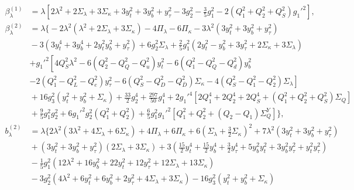 \documentclass[preprint,amsmath,amssymb,aps,superscriptaddress,prd,showpacs,floatfix,nofootinbib]{revtex4-1}
\begin{document}
\begin{subequations}\label{eq:USSMLambdaBetas}
\begin{align}
\beta_\lambda^{(1)}&=\lambda  \left[2\lambda ^2+2 \Sigma_\lambda +3 \Sigma_\kappa +3 y_t^2+3 y_b^2+y_{\tau }^2-3 g_2^2-\frac{3}{5} g_1^2 -2 \left ( Q_1^2 + Q_2^2 + Q_S^2\right )g_1'^2 \right],\label{eq:USSMLambdaBetaOneLoop}\\
\beta_\lambda^{(2)}&=\lambda \bigg \{ -2\lambda^2\left ( \lambda^2+2\Sigma_\lambda+3\Sigma_\kappa\right )-4\Pi_\lambda-6\Pi_\kappa-3\lambda^2\left ( 3y_t^2+3y_b^2+y_\tau^2\right ) \nonumber\\
&{} -3\left ( 3y_t^4+3y_b^4+2y_t^2y_b^2+y_\tau^2 \right )+6g_2^2\Sigma_\lambda+\frac{2}{5}g_1^2\left ( 2y_t^2-y_b^2+3y_\tau^2+2\Sigma_\kappa +3\Sigma_\lambda\right )\nonumber\\
&{}\left.+g_1'^2\left [ 4Q_S^2\lambda^2 -6\left ( Q_2^2-Q_Q^2-Q_u^2\right )y_t^2-6\left ( Q_1^2-Q_Q^2-Q_d^2\right )y_b^2 \right.\right.\nonumber\\
&{}\left.-2\left ( Q_1^2-Q_L^2-Q_e^2\right )y_\tau^2-6\left ( Q_S^2-Q_D^2-Q_{\overline{D}}^2 \right )\Sigma_\kappa-4\left ( Q_S^2-Q_1^2-Q_2^2\right )\Sigma_\lambda\right ]\nonumber\\
&{}+16g_3^2\left ( y_t^2+y_b^2+\Sigma_\kappa\right ) +\frac{33}{2}g_2^4+\frac{297}{50}g_1^4+2g_1'^4\left [ 2Q_1^4+2Q_2^4+2Q_S^4+\left ( Q_1^2+Q_2^2+Q_S^2\right )\Sigma_{Q}\right ]\nonumber\\
&{}+\frac{9}{5}g_1^2g_2^2+6g_1'^2g_2^2\left ( Q_1^2+Q_2^2\right )+\frac{6}{5}g_1^2g_1'^2\left [Q_1^2+Q_2^2+\left ( Q_2-Q_1\right )\Sigma_{Q}^Y\right ]\bigg \},\label{eq:USSMLambdaBetaTwoLoop}\\
b_\lambda^{(2)}&=\lambda \bigg \{ 2\lambda^2\left ( 3\lambda^2 +4\Sigma_\lambda +6\Sigma_\kappa \right )+4\Pi_\lambda + 6\Pi_\kappa +6\left ( \Sigma_\lambda+\frac{3}{2}\Sigma_\kappa\right )^2+7\lambda^2\left ( 3y_t^2+3y_b^2+y_\tau^2\right )\nonumber\\
&{}+\left ( 3y_t^2+3y_b^2+y_\tau^2\right )\left (2\Sigma_\lambda+3\Sigma_\kappa\right ) +3\left ( \frac{15}{2}y_t^4+\frac{15}{2}y_b^4+\frac{3}{2}y_\tau^4 +5y_b^2y_t^2 +3y_b^2y_\tau^2 +y_t^2y_\tau^2\right )\nonumber\\
&{}-\frac{1}{5}g_1^2\left ( 12\lambda^2+16y_b^2+22y_t^2+12y_\tau^2+12\Sigma_\lambda +13\Sigma_\kappa \right )\nonumber\\
&{}-3g_2^2\left ( 4\lambda^2+6y_t^2+6y_b^2+2y_\tau^2+4\Sigma_\lambda+3\Sigma_\kappa\right )-16g_3^2\left ( y_t^2+y_b^2+\Sigma_\kappa \right )\nonumber\\

\end{align}
\end{subequations}
\end{document}
